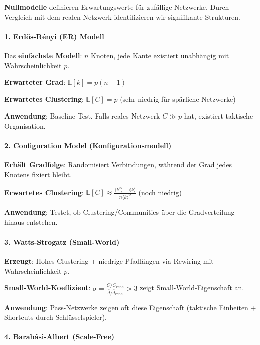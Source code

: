 \textbf{Nullmodelle} definieren Erwartungswerte für zufällige Netzwerke. Durch Vergleich mit dem realen Netzwerk identifizieren wir signifikante Strukturen.

\paragraph{1. Erdős-Rényi (ER) Modell}

Das \textbf{einfachste Modell}: $n$ Knoten, jede Kante existiert unabhängig mit Wahrscheinlichkeit $p$.

\textbf{Erwarteter Grad}: $\mathbb{E}[k] = p(n-1)$

\textbf{Erwartetes Clustering}: $\mathbb{E}[C] = p$ (sehr niedrig für spärliche Netzwerke)

\textbf{Anwendung}: Baseline-Test. Falls reales Netzwerk $C \gg p$ hat, existiert taktische Organisation.

\paragraph{2. Configuration Model (Konfigurationsmodell)}

\textbf{Erhält Gradfolge}: Randomisiert Verbindungen, während der Grad jedes Knotens fixiert bleibt.

\textbf{Erwartetes Clustering}: $\mathbb{E}[C] \approx \frac{\langle k^2 \rangle - \langle k \rangle}{n \langle k \rangle^2}$ (noch niedrig)

\textbf{Anwendung}: Testet, ob Clustering/Communities über die Gradverteilung hinaus entstehen.

\paragraph{3. Watts-Strogatz (Small-World)}

\textbf{Erzeugt}: Hohes Clustering + niedrige Pfadlängen via Rewiring mit Wahrscheinlichkeit $p$.

\textbf{Small-World-Koeffizient}: $\sigma = \frac{C / C_{rand}}{\bar{d} / \bar{d}_{rand}} > 3$ zeigt Small-World-Eigenschaft an.

\textbf{Anwendung}: Pass-Netzwerke zeigen oft diese Eigenschaft (taktische Einheiten + Shortcuts durch Schlüsselspieler).

\paragraph{4. Barabási-Albert (Scale-Free)}

